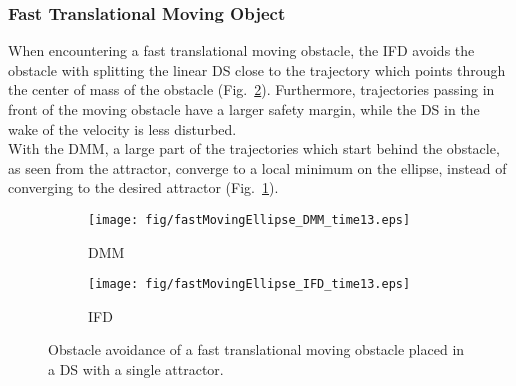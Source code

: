 \subsubsection{Fast Translational Moving Object}
When encountering a fast translational moving obstacle, the IFD avoids the obstacle with splitting the linear DS close to the trajectory which points through the center of mass of the obstacle (Fig.~\ref{fig:fastMovingEllipse_IFD_time13}). Furthermore,  trajectories passing in front of the moving obstacle have a larger safety margin, while the  DS in the wake of the velocity is less disturbed. \\
With the DMM, a large part of the trajectories which start behind the obstacle, as seen from the attractor, converge to a local minimum on the ellipse, instead of converging to the desired attractor (Fig.~\ref{fig:fastMovingEllipse_DMM_time13}).

\begin{figure}[tb]\centering
\begin{subfigure}{.48\columnwidth} %
\centering
\texttt{[image: fig/fastMovingEllipse\_DMM\_time13.eps]}
\caption{DMM}
\label{fig:fastMovingEllipse_DMM_time13}
\end{subfigure}%
\begin{subfigure}{.48\columnwidth} %
\centering
\texttt{[image: fig/fastMovingEllipse\_IFD\_time13.eps]}
\caption{IFD}
\label{fig:fastMovingEllipse_IFD_time13}
\end{subfigure}
\caption{Obstacle avoidance of a fast translational moving obstacle placed in a DS with a single attractor.}
\label{fig:fastMovingEllipse_fig}
\end{figure}




